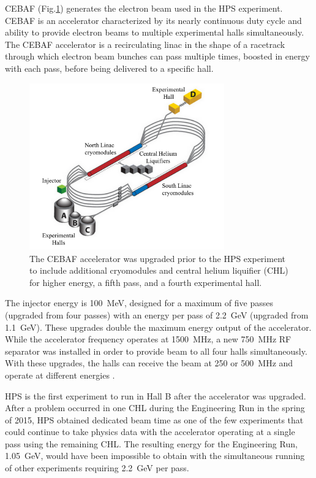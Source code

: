 CEBAF (Fig.\ref{Figure:cebaf}) generates the electron beam used in the HPS experiment. CEBAF is an accelerator characterized by its nearly continuous duty cycle and ability to provide electron beams to multiple experimental halls simultaneously. The CEBAF accelerator is a recirculating linac in the shape of a racetrack through which electron beam bunches can pass multiple times, boosted in energy with each pass, before being delivered to a specific hall. 

\begin{figure}[H]
  \centering
      \includegraphics[width=0.75\textwidth]{pics/experiment/cebafLabel.png}
  \caption[CEBAF accelerator]{The CEBAF accelerator was upgraded prior to the HPS experiment to include additional cryomodules and central helium liquifier (CHL) for higher energy, a fifth pass, and a fourth experimental hall.}
  \label{Figure:cebaf}
\end{figure}

The injector energy is 100~MeV, designed for a maximum of five passes (upgraded from four passes) with an energy per pass of 2.2~GeV (upgraded from 1.1~GeV). These upgrades double the maximum energy output of the accelerator. While the accelerator frequency operates at 1500~MHz, a new 750~MHz RF separator was installed in order to provide beam to all four halls simultaneously. With these upgrades, the halls can receive the beam at 250 or 500~MHz and operate at different energies \cite{kazimi}. 

HPS is the first experiment to run in Hall B after the accelerator was upgraded. After a problem occurred in one CHL during the Engineering Run in the spring of 2015, HPS obtained dedicated beam time as one of the few experiments that could continue to take physics data with the accelerator operating at a single pass using the remaining CHL. The resulting energy for the Engineering Run, 1.05~GeV, would have been impossible to obtain with the simultaneous running of other experiments requiring 2.2~GeV per pass.  
